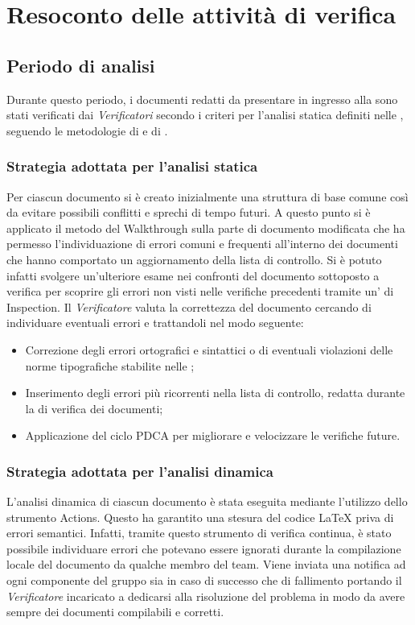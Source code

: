\section{Resoconto delle attività di verifica}
\label{resoconto}
\subsection{Periodo di analisi}
Durante questo periodo, i documenti redatti da presentare in ingresso alla  sono stati verificati dai \textit{Verificatori} secondo i criteri per l'analisi statica definiti nelle , seguendo le metodologie di  e di .
\subsubsection{Strategia adottata per l'analisi statica}
Per ciascun documento si è creato inizialmente una struttura di base comune così da evitare possibili conflitti e sprechi di tempo futuri. A questo punto si è applicato il metodo del Walkthrough sulla parte di documento modificata che ha permesso l'individuazione di errori comuni e frequenti all'interno dei documenti che hanno comportato un aggiornamento della lista di controllo. Si è potuto infatti svolgere un'ulteriore esame nei confronti del documento sottoposto a verifica per scoprire gli errori non visti nelle verifiche precedenti tramite un' di Inspection. Il \textit{Verificatore} valuta la correttezza del documento cercando di individuare eventuali errori e trattandoli nel modo seguente:
	\begin{itemize}
		\item Correzione degli errori ortografici e sintattici o di eventuali violazioni delle norme tipografiche stabilite nelle ;
		\item Inserimento degli errori più ricorrenti nella lista di controllo, redatta durante la  di verifica dei documenti;
		\item Applicazione del ciclo PDCA per migliorare e velocizzare le verifiche future.
	\end{itemize}
\subsubsection{Strategia adottata per l'analisi dinamica}
L'analisi dinamica di ciascun documento è stata eseguita mediante l'utilizzo dello strumento  Actions. Questo ha garantito una stesura del codice \LaTeX{} priva di errori semantici. Infatti, tramite questo strumento di verifica continua, è stato possibile individuare errori che potevano essere ignorati durante la compilazione locale del documento da qualche membro del team. Viene inviata una notifica ad ogni componente del gruppo sia in caso di successo che di fallimento portando il \textit{Verificatore} incaricato a dedicarsi alla risoluzione del problema in modo da avere sempre dei documenti compilabili e corretti.
